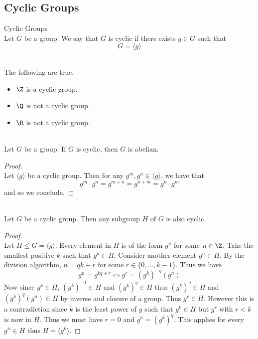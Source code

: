 \documentclass[a4paper]{article}
\begin{document}
\subsection{Cyclic Groups}
\begin{defn}{Cyclic Groups}{}\\
Let $G$ be a group. We say that $G$ is cyclic if there exists $g\in G$ such that $$G=\langle g\rangle$$
\end{defn}

\begin{eg}{}{}\\
The following are true. 
\begin{itemize}
\item $\Z$ is a cyclic group. 
\item $\Q$ is not a cyclic group. 
\item $\R$ is not a cyclic group. 
\end{itemize}
\end{eg}

\begin{lmm}{}{}\\
Let $G$ be a group. If $G$ is cyclic, then $G$ is abelian. 
\begin{proof}\\
Let $\langle g\rangle$ be a cyclic group. Then for any $g^m,g^n\in\langle g\rangle$, we have that $$g^m\cdot g^n=g^{m+n}=g^{n+m}=g^n\cdot g^m$$ and so we conclude. 
\end{proof}
\end{lmm}

\begin{prp}{}{}\\
Let $G$ be a cyclic group. Then any subgroup $H$ of $G$ is also cyclic. 
\begin{proof}\\
Let $H\leq G=\langle g\rangle$. Every element in $H$ is of the form $g^n$ for some $n\in\Z$. Take the smallest positive $k$ such that $g^k\in H$. Consider another element $g^n\in H$. By the division algorithm, $n=qk+r$ for some $r\in\{0,\dots,k-1\}$. Thus we have $$g^n=g^{kq+r}\iff g^r=(g^k)^{-q}(g^n)$$ Now since $g^k\in H$, $(g^k)^{-1}\in H$ and $(g^k)^q\in H$ thus $(g^k)^q\in H$ and $(g^k)^q(g^n)\in H$ by inverse and closure of a group. Thus $g^r\in H$. However this is a contradiction since $k$ is the least power of $g$ such that $g^k\in H$ but $g^r$ with $r<k$ is now in $H$. Thus we must have $r=0$ and $g^n=(g^k)^q$. This applies for every $g^n\in H$ thus $H=\langle g^k\rangle$. 
\end{proof}
\end{prp}
\end{document}
